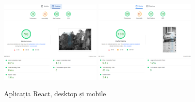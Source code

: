\documentclass[12pt, a4paper]{report}
\begin{document}
\begin{figure}[htbp]
	\centering
	\includegraphics[width=0.45\textwidth]{02_desktop_pagespeed.png}
	\includegraphics[width=0.45\textwidth]{02_mobile_pagespeed.png}
	\caption{Aplicația React, desktop și mobile}
	\label{fig:02-deployed-pagespeed}
\end{figure}











\renewcommand{\bibname}{Bibliografie}

\end{document}
